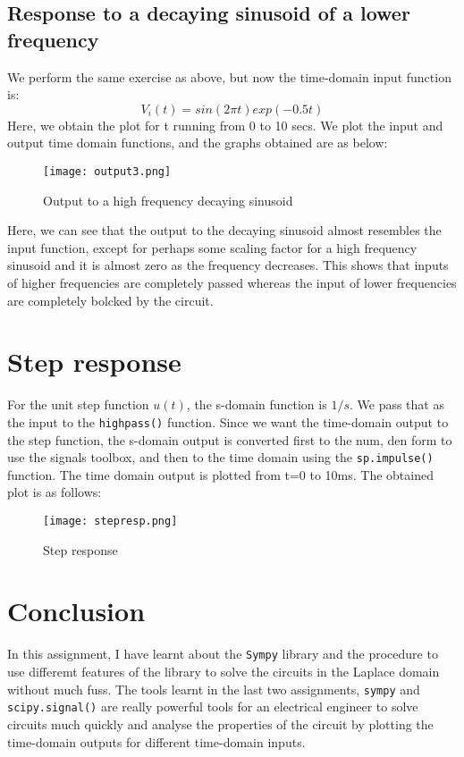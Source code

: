 \documentclass[11pt, a4paper]{article}
\begin{document}
\subsection{Response to a decaying sinusoid of a lower frequency}
We perform the same exercise as above, but now the time-domain input function is:
\[V_i(t) = sin(2\pi t)exp(-0.5t)\]
Here, we obtain the plot for t running from 0 to 10 secs. We plot the input and output time domain functions, and the graphs obtained are as below:
\begin{figure}[H]
\centering
  \texttt{[image: output3.png]}  
\caption{Output to a high frequency decaying sinusoid}
\end{figure}

Here, we can see that the output to the decaying sinusoid almost resembles the input function, except for perhaps some scaling factor for a high frequency sinusoid and it is almost zero as the frequency decreases. This shows that inputs of higher frequencies are completely passed whereas the input of lower frequencies are completely bolcked by the circuit.

\section{Step response}
For the unit step function \(u(t)\), the s-domain function is \(1/s\). We pass that as the input to the \texttt{highpass()} function. Since we want the time-domain output to the step function, the s-domain output is converted first to the num, den form to use the signals toolbox, and then to the time domain using the \texttt{sp.impulse()} function. The time domain output is plotted from t=0 to 10ms. The obtained plot is as follows:
\begin{figure}[H]
\centering
  \texttt{[image: stepresp.png]}  
\caption{Step response}
\end{figure}

\section{Conclusion}
In this assignment, I have learnt about the \texttt{Sympy} library and the procedure to use differemt features of the library to solve the circuits in the Laplace domain without much fuss. The tools learnt in the last two assignments, \texttt{sympy} and \texttt{scipy.signal()} are really powerful tools for an electrical engineer to solve circuits much quickly and analyse the properties of the circuit by plotting the time-domain outputs for different time-domain inputs. 
\end{document}
